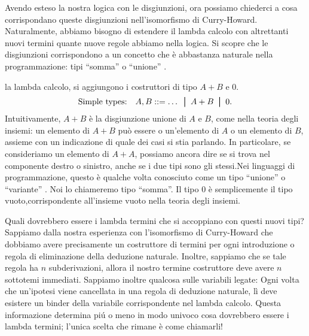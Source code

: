 \documentclass{article}
\begin{document}
Avendo esteso la nostra logica con le disgiunzioni, ora possiamo chiederci
a cosa  corrispondano queste disgiunzioni nell'isomorfismo di Curry-Howard.
Naturalmente, abbiamo bisogno di estendere il lambda calcolo con altrettanti
nuovi termini quante nuove regole abbiamo  nella logica. Si scopre che le
disgiunzioni corrispondono a un concetto che \`e abbastanza naturale nella
programmazione: tipi ``somma'' o ``unione'' . 

la lambda calcolo, si aggiungono i costruttori di tipo $A+B$ e $0$.
\[ \mbox{Simple types:}\ssep A,B \bnf \ldots\bor A+B\bor 0.
\]
Intuitivamente, $A+B$ \`e la disgiunzione unione di $A$ e $B$, come nella teoria
degli insiemi: un elemento di $A+B$ pu\`o essere o un'elemento di $A$ o un elemento
di $B$, assieme con un indicazione di quale dei casi si stia parlando. In
particolare, se consideriamo un elemento di $A+A$, possiamo ancora dire se
si trova nel componente destro o sinistro, anche se i due
tipi sono gli stessi.Nei linguaggi di programmazione, questo è qualche volta conosciuto
come un tipo ``unione'' o ``variante'' . Noi lo chiameremo tipo ``somma''.
Il tipo  $0$ \`e semplicemente il tipo vuoto,corrispondente all'insieme vuoto
nella teoria degli insiemi.

Quali dovrebbero essere i lambda termini che si accoppiano con questi nuovi tipi?  Sappiamo
dalla nostra esperienza con l'isomorfismo di Curry-Howard che dobbiamo
avere precisamente un costruttore di termini per ogni introduzione o
regola di eliminazione della deduzione naturale. Inoltre, sappiamo che se tale
regola ha $n$ subderivazioni, allora il nostro termine costruttore deve avere
$n$ sottotemi immediati. Sappiamo inoltre qualcosa sulle variabili legate:
Ogni volta che un'ipotesi viene cancellata in una regola di deduzione naturale, l\`i
deve esistere un binder della variabile corrispondente nel lambda calcolo.
Questa informazione determina pi\'u o meno in modo univoco cosa dovrebbero essere i lambda
termini; l'unica scelta che rimane \`e come chiamarli!
\end{document}
